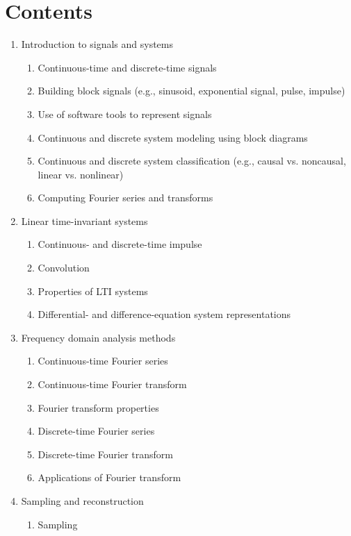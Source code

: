 \documentclass[11pt, a4paper]{article}
\begin{document}
\section{Contents}
\begin{multicols}{2}
\begin{enumerate}
  \item Introduction to signals and systems
  \begin{enumerate}
    \item Continuous-time and discrete-time signals
    \item Building block signals (e.g., sinusoid, exponential signal, pulse, impulse)
    \item Use of software tools to represent signals
    \item Continuous and discrete system modeling using block diagrams
    \item Continuous and discrete system classification (e.g., causal vs. noncausal, linear vs. nonlinear)
    \item Computing Fourier series and transforms
  \end{enumerate}
  \item Linear time-invariant systems
  \begin{enumerate}
    \item Continuous- and discrete-time impulse
    \item Convolution
    \item Properties of LTI systems
    \item Differential- and difference-equation system representations
  \end{enumerate}
  \item Frequency domain analysis methods
  \begin{enumerate}
    \item Continuous-time Fourier series
    \item Continuous-time Fourier transform
    \item Fourier transform properties
    \item Discrete-time Fourier series
    \item Discrete-time Fourier transform
    \item Applications of Fourier transform
  \end{enumerate}
  \item Sampling and reconstruction
  \begin{enumerate}
    \item Sampling

\end{enumerate}
\end{enumerate}
\end{multicols}
\end{document}
